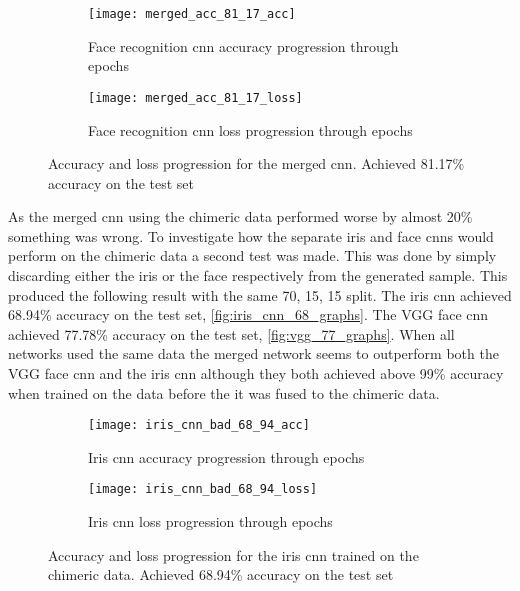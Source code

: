 \begin{figure}[H]
	\centering
	\begin{subfigure}{0.48\textwidth}
		\centering
		\texttt{[image: merged\_acc\_81\_17\_acc]}
		\caption{Face recognition \gls{cnn} accuracy progression through epochs}
		\label{fig:merged_acc}
	\end{subfigure}
	\begin{subfigure}{0.48\textwidth}
		\centering
		\texttt{[image: merged\_acc\_81\_17\_loss]}
		\caption{Face recognition \gls{cnn} loss progression through epochs}
		\label{fig:merged_loss}
	\end{subfigure}
	\caption{Accuracy and loss progression for the merged \gls{cnn}. Achieved 81.17\% accuracy on the test set}
	\label{fig:merged_graphs}
\end{figure}

\noindent As the merged \gls{cnn} using the chimeric data performed worse by almost 20\% something was wrong. To investigate how the separate iris and face \gls{cnn}s would perform on the chimeric data a second test was made. This was done by simply discarding either the iris or the face respectively from the generated sample. This produced the following result with the same 70, 15, 15 split.  The iris \gls{cnn} achieved 68.94\% accuracy on the test set, \autoref{fig:iris_cnn_68_graphs}. The VGG face \gls{cnn} achieved 77.78\% accuracy on the test set, \autoref{fig:vgg_77_graphs}. When all networks used the same data the merged network seems to outperform both the VGG face \gls{cnn} and the iris \gls{cnn} although they both achieved above 99\% accuracy when trained on the data before the it was fused to the chimeric data.

\begin{figure}[H]
	\centering
	\begin{subfigure}{0.48\textwidth}
		\centering
		\texttt{[image: iris\_cnn\_bad\_68\_94\_acc]}
		\caption{Iris \gls{cnn} accuracy progression through epochs}
		\label{fig:iris_cnn_68_acc}
	\end{subfigure}
	\begin{subfigure}{0.48\textwidth}
		\centering
		\texttt{[image: iris\_cnn\_bad\_68\_94\_loss]}
		\caption{Iris \gls{cnn} loss progression through epochs}
		\label{fig:iris_cnn_68_loss}
	\end{subfigure}
	\caption{Accuracy and loss progression for the iris \gls{cnn} trained on the chimeric data. Achieved 68.94\% accuracy on the test set}
	\label{fig:iris_cnn_68_graphs}
\end{figure}


